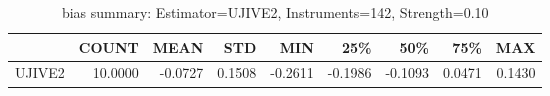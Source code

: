 \begin{table}[ht]
\centering
\caption{bias summary: Estimator=UJIVE2, Instruments=142, Strength=0.10}
\begin{tabular}{lrrrrrrrr}
\toprule
 & COUNT & MEAN & STD & MIN & 25\% & 50\% & 75\% & MAX \\
\midrule
UJIVE2 & 10.0000 & -0.0727 & 0.1508 & -0.2611 & -0.1986 & -0.1093 & 0.0471 & 0.1430 \\
\bottomrule
\end{tabular}
\end{table}
